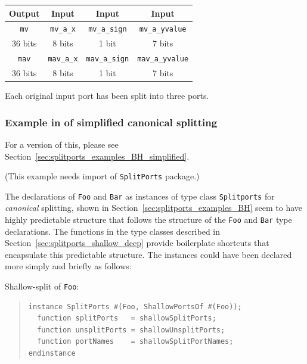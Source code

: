 \begin{center}
  \begin{tabular}{|c||c|c|c|}
    \hline
     Output &
     Input  &
     Input  &
     Input  \\
    \hline
     {\tt mv}            &
     {\tt mv\_a\_x}      &
     {\tt mv\_a\_sign}   &
     {\tt mv\_a\_yvalue} \\
     36 bits &
      8 bits &
      1 bit  &
      7 bits \\
    \hline
     {\tt mav}            &
     {\tt mav\_a\_x}      &
     {\tt mav\_a\_sign}   &
     {\tt mav\_a\_yvalue} \\
     36 bits &
      8 bits &
      1 bit  &
      7 bits \\
    \hline
  \end{tabular}
\end{center}

Each original input port has been split into three ports.


\subsubsection{Example in {\BSVb} of simplified canonical splitting}

\label{sec:splitports_examples_BSV_simplified}

{\footnotesize  For a {\BHb} version of this, please see
  Section~\ref{sec:splitports_examples_BH_simplified}.}

{\footnotesize (This example needs import of {\tt SplitPorts} package.)}

The declarations of {\tt Foo} and {\tt Bar} as instances of type class
{\tt Splitports} for \emph{canonical} splitting, shown in
Section~\ref{sec:splitports_examples_BH} seem to have highly
predictable structure that follows the structure of the {\tt Foo} and
{\tt Bar} type declarations. The functions in the type classes
described in Section~\ref{sec:splitports_shallow_deep} provide
boilerplate shortcuts that encapsulate this predictable structure.
The instances could have been declared more simply and briefly as
follows:

Shallow-split of {\tt Foo}:
\begin{quote}
\begin{verbatim}
instance SplitPorts #(Foo, ShallowPortsOf #(Foo));
  function splitPorts   = shallowSplitPorts;
  function unsplitPorts = shallowUnsplitPorts;
  function portNames    = shallowSplitPortNames;
endinstance
\end{verbatim}
\end{quote}

